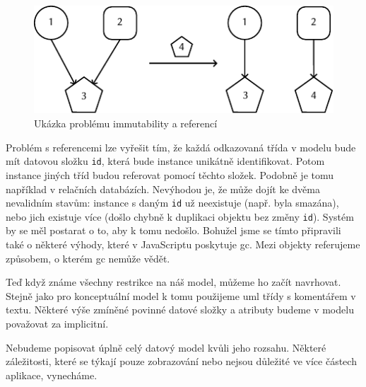 \begin{figure}[!htb]
  \centering
  \includegraphics[width=\maxwidth{\textwidth}]{../img/react-references.pdf}
  \caption{Ukázka problému immutability a referencí}
  \label{fig:immutability-references}
\end{figure}

Problém s referencemi lze vyřešit tím, že každá odkazovaná třída v modelu bude mít datovou složku \texttt{id}, která bude instance unikátně identifikovat.
Potom instance jiných tříd budou referovat pomocí těchto složek.
Podobně je tomu například v relačních databázích.
Nevýhodou je, že může dojít ke dvěma nevalidním stavům: instance s daným \texttt{id} už neexistuje (např. byla smazána), nebo jich existuje více (došlo chybně k duplikaci objektu bez změny \texttt{id}).
Systém by se měl postarat o to, aby k tomu nedošlo.
Bohužel jsme se tímto připravili také o některé výhody, které v JavaScriptu poskytuje \acrfull{gc}.
Mezi objekty referujeme způsobem, o kterém \acrshort{gc} nemůže vědět.

Teď když známe všechny restrikce na náš model, můžeme ho začít navrhovat.
Stejně jako pro konceptuální model k tomu použijeme \acrshort{uml} třídy s komentářem v textu.
Některé výše zmíněné povinné datové složky a atributy budeme v modelu považovat za implicitní.

Nebudeme popisovat úplně celý datový model kvůli jeho rozsahu.
Některé záležitosti, které se týkají pouze zobrazování nebo nejsou důležité ve více částech aplikace, vynecháme.

